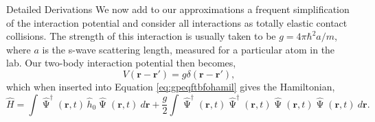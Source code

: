 \begin{chapter}{Detailed Derivations\label{app:App2}}
We now add to our approximations a frequent simplification of the interaction potential and consider all interactions as totally elastic contact collisions. The strength of this interaction is usually taken to be $g=4\pi\hbar^2a/m$, where $a$ is the s-wave scattering length, measured for a particular atom in the lab. Our two-body interaction potential then becomes,
\begin{equation*}
V(\mathbf{r}-\mathbf{r}') = g \delta(\mathbf{r}-\mathbf{r}'),
\end{equation*}
which when inserted into Equation \ref{eq:gpeqftbfohamil} gives the Hamiltonian,
\begin{equation*}
\hat{H} = \int \hat{\upPsi}^\dagger(\mathbf{r},t)\,\hat{h}_0 \hat{\upPsi}(\mathbf{r},t)~d\mathbf{r}+\frac{g}{2}\int \hat{\upPsi}^\dagger(\mathbf{r},t)\hat{\upPsi}^\dagger(\mathbf{r},t)\hat{\upPsi}(\mathbf{r},t)\hat{\upPsi}(\mathbf{r},t)~d\mathbf{r}.
\label{eq:gpeqftvgdhamil}
\end{equation*}


\end{chapter}
